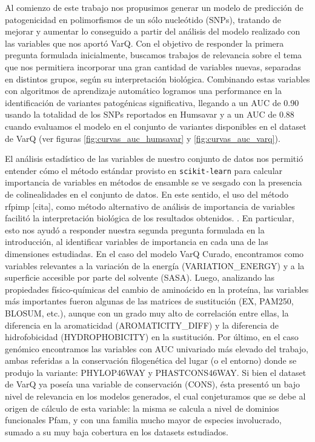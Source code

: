 Al comienzo de este trabajo nos propusimos generar un modelo de predicción de patogenicidad en polimorfismos de un sólo nucleótido (SNPs), tratando de mejorar y aumentar lo conseguido a partir del análisis del modelo realizado con las variables que nos aportó VarQ. Con el objetivo de responder la primera pregunta formulada inicialmente, buscamos trabajos de relevancia sobre el tema que nos permitiera incorporar una gran cantidad de variables nuevas, separadas en distintos grupos, según su interpretación biológica. Combinando estas variables con algoritmos de aprendizaje automático logramos una performance en la identificación de variantes patogénicas significativa, llegando a un AUC de 0.90 usando la totalidad de los SNPs reportados en Humsavar y a un AUC de 0.88 cuando evaluamos el modelo en el conjunto de variantes disponibles en el dataset de VarQ (ver figuras \ref{fig:curvas_auc_humsavar} y \ref{fig:curvas_auc_varq}).

El análisis estadístico de las variables de nuestro conjunto de datos nos permitió entender cómo el método estándar provisto en \texttt{scikit-learn} para calcular importancia de variables en métodos de ensamble se ve sesgado con la presencia de colinealidades en el conjunto de datos. En este sentido, el uso del método rfpimp [cita], como método alternativo de análisis de importancia de variables facilitó la interpretación biológica de los resultados obtenidos. . En particular, esto nos ayudó a responder nuestra segunda pregunta formulada en la introducción, al identificar variables de importancia en cada una de las dimensiones estudiadas. En el caso del modelo VarQ Curado, encontramos como variables relevantes a la variación de la energía (VARIATION\_ENERGY) y a la superficie accesible por parte del solvente (SASA). Luego, analizando las propiedades físico-químicas del cambio de aminoácido en la proteína, las variables más importantes fueron algunas de las matrices de sustitución (EX, PAM250, BLOSUM, etc.), aunque con un grado muy alto de correlación entre ellas, la diferencia en la aromaticidad (AROMATICITY\_DIFF) y la diferencia de hidrofobicidad (HYDROPHOBICITY) en la sustitución. Por último, en el caso genómico encontramos las variables con AUC univariado más elevado del trabajo, ambas referidas a la conservación filogenética del lugar (o el entorno) donde se produjo la variante: PHYLOP46WAY y PHASTCONS46WAY. Si bien el dataset de VarQ ya poseía una variable de conservación (CONS), ésta presentó un bajo nivel de relevancia en los modelos generados, el cual conjeturamos que se debe al origen de cálculo de esta variable: la misma se calcula a nivel de dominios funcionales Pfam, y con una familia mucho mayor de especies involucrado, sumado a su muy baja cobertura en los datasets estudiados.


